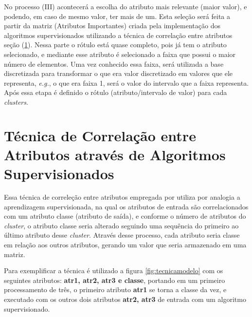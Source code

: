 

No processo (III) acontecerá a escolha do atributo mais relevante (maior valor), e podendo, em caso de mesmo valor, ter mais de um. Esta seleção será feita a partir da matriz (Atributos Importantes) criada pela implementação dos algoritmos supervisionados utilizando a técnica de correlação entre atributos seção (\ref{cap:ferramentas:sec:tecnica}). Nessa parte o rótulo está quase completo, pois já tem o atributo selecionado, e mediante esse atributo é selecionado a faixa que possui o maior número de elementos. Uma vez conhecido essa faixa, será utilizada a base discretizada para transformar o que era valor discretizado em valores que ele representa, \textit{e.g.}, o que era faixa 1, será o valor do intervalo que a faixa representa. Após essa etapa é definido o rótulo (atributo/intervalo de valor) para cada \textit{clusters}. 

\section{Técnica de Correlação entre Atributos através de Algoritmos Supervisionados}\label{cap:ferramentas:sec:tecnica}

Essa técnica de correleção entre atributos empregada por \cite{Lopes2016} utiliza por analogia a aprendizagem supervisionada, na qual os atributos de entrada são correlacionados com um atributo classe (atributo de saída), e conforme o número de atributos do \textit{cluster}, o atributo classe seria alterado seguindo uma sequência do primeiro ao último atributo desse \textit{cluster}. Através desse processo, cada atributo seria classe em relação aos outros atributos, gerando um valor que seria armazenado em uma matriz. 

Para exemplificar a técnica é utilizado a figura \ref{fig:tecnicamodelo} com os seguintes atributos: \textbf{atr1, atr2, atr3 e classe}, portando em um primeiro processamento de três, o primeiro atributo \textbf{atr1} se torna a classe da vez, e executado com os outros dois atributos \textbf{atr2, atr3} de entrada com um algoritmo supervisionado.

